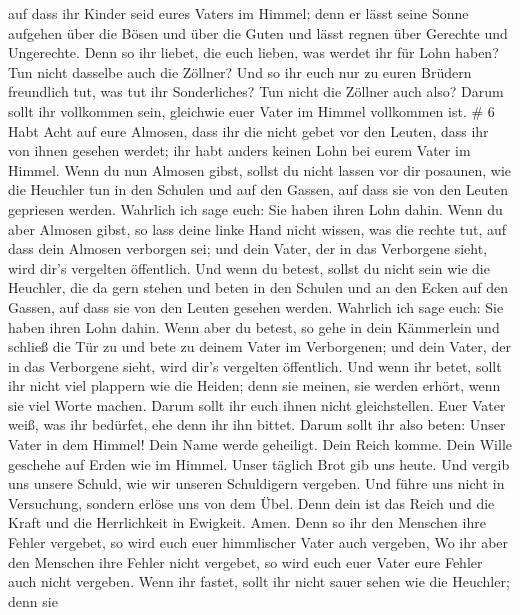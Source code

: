  auf dass ihr Kinder seid eures Vaters im Himmel; denn er
lässt seine Sonne aufgehen über die Bösen und über die Guten und lässt
regnen über Gerechte und Ungerechte.  Denn so ihr liebet,
die euch lieben, was werdet ihr für Lohn haben? Tun nicht dasselbe auch
die Zöllner?  Und so ihr euch nur zu euren Brüdern
freundlich tut, was tut ihr Sonderliches? Tun nicht die Zöllner auch
also?  Darum sollt ihr vollkommen sein, gleichwie euer
Vater im Himmel vollkommen ist. \# 6  Habt Acht auf eure
Almosen, dass ihr die nicht gebet vor den Leuten, dass ihr von ihnen
gesehen werdet; ihr habt anders keinen Lohn bei eurem Vater im Himmel.
 Wenn du nun Almosen gibst, sollst du nicht lassen vor dir
posaunen, wie die Heuchler tun in den Schulen und auf den Gassen, auf
dass sie von den Leuten gepriesen werden. Wahrlich ich sage euch: Sie
haben ihren Lohn dahin.  Wenn du aber Almosen gibst, so lass
deine linke Hand nicht wissen, was die rechte tut,  auf dass
dein Almosen verborgen sei; und dein Vater, der in das Verborgene sieht,
wird dir's vergelten öffentlich.  Und wenn du betest, sollst
du nicht sein wie die Heuchler, die da gern stehen und beten in den
Schulen und an den Ecken auf den Gassen, auf dass sie von den Leuten
gesehen werden. Wahrlich ich sage euch: Sie haben ihren Lohn dahin.
 Wenn aber du betest, so gehe in dein Kämmerlein und schließ
die Tür zu und bete zu deinem Vater im Verborgenen; und dein Vater, der
in das Verborgene sieht, wird dir's vergelten öffentlich. 
Und wenn ihr betet, sollt ihr nicht viel plappern wie die Heiden; denn
sie meinen, sie werden erhört, wenn sie viel Worte machen. 
Darum sollt ihr euch ihnen nicht gleichstellen. Euer Vater weiß, was ihr
bedürfet, ehe denn ihr ihn bittet.  Darum sollt ihr also
beten: Unser Vater in dem Himmel! Dein Name werde geheiligt.
 Dein Reich komme. Dein Wille geschehe auf Erden wie im
Himmel.  Unser täglich Brot gib uns heute. 
Und vergib uns unsere Schuld, wie wir unseren Schuldigern vergeben.
 Und führe uns nicht in Versuchung, sondern erlöse uns von
dem Übel. Denn dein ist das Reich und die Kraft und die Herrlichkeit in
Ewigkeit. Amen.  Denn so ihr den Menschen ihre Fehler
vergebet, so wird euch euer himmlischer Vater auch vergeben,
 Wo ihr aber den Menschen ihre Fehler nicht vergebet, so
wird euch euer Vater eure Fehler auch nicht vergeben.  Wenn
ihr fastet, sollt ihr nicht sauer sehen wie die Heuchler; denn sie
